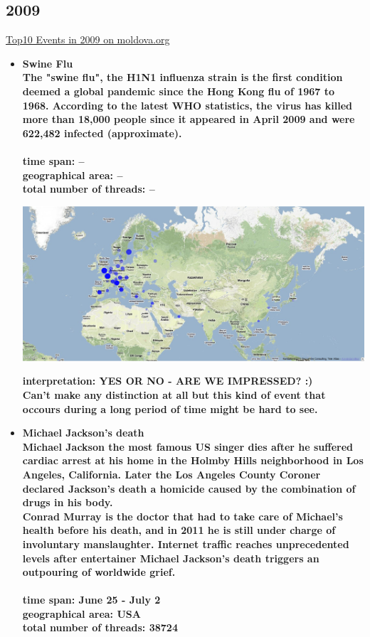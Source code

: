 \documentclass[11pt,a4paper,english]{article}
\begin{document}
			\subsection{2009}
			\href{http://social.moldova.org/news/10-most-important-world-events-of-2009-217390-eng.html}{Top10 Events in 2009 on moldova.org}
				\begin{itemize}
					\item \bf Swine Flu \rm
						\\ The "swine flu", the H1N1 influenza strain is the first condition deemed a global pandemic since the Hong Kong flu of 1967 to 1968. According to the latest WHO statistics, the virus has killed more than 18,000 people since it appeared in April 2009 and were 622,482 infected (approximate).
						\\\\ \bf time span: \rm --
						\\ \bf geographical area: \rm --
						\\ \bf total number of threads: \rm --
						
						\includegraphics[width=130mm]{img/post-birdflu}
						
						\bf interpretation: \rm YES OR NO - ARE WE IMPRESSED? :)
						\\ Can't make any distinction at all but this kind of event that occours during a long period of time might be hard to see.
						
						
					\item \bf Michael Jackson's death \rm
						\\ Michael Jackson the most famous US singer dies after he suffered cardiac arrest at his home in the Holmby Hills neighborhood in Los Angeles, California. Later the Los Angeles County Coroner declared Jackson's death a homicide caused by the combination of drugs in his body.
						\\ Conrad Murray is the doctor that had to take care of Michael's health before his death, and in 2011 he is still under charge of involuntary manslaughter. Internet traffic reaches unprecedented levels after entertainer Michael Jackson's death triggers an outpouring of worldwide grief.
						\\\\ \bf time span: \rm June 25 - July 2
						\\ \bf geographical area: \rm USA
						\\ \bf total number of threads: \rm 38724
						

\end{itemize}
\end{document}
